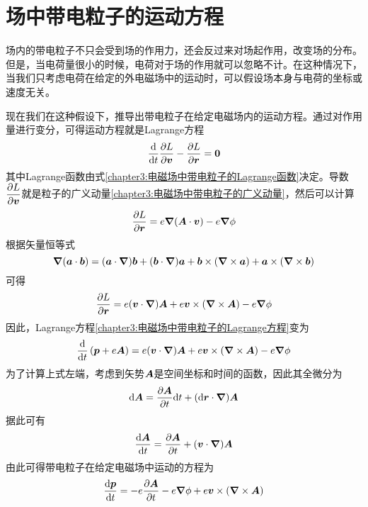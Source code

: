 \section{场中带电粒子的运动方程}

场内的带电粒子不只会受到场的作用力，还会反过来对场起作用，改变场的分布。但是，当电荷量很小的时候，电荷对于场的作用就可以忽略不计。在这种情况下，当我们只考虑电荷在给定的外电磁场中的运动时，可以假设场本身与电荷的坐标或速度无关。

现在我们在这种假设下，推导出带电粒子在给定电磁场内的运动方程。通过对作用量进行变分，可得运动方程就是Lagrange方程
\begin{equation}
	\frac{\mathrm{d}}{\mathrm{d} t} \frac{\partial L}{\partial \boldsymbol{v}} - \frac{\partial L}{\partial \boldsymbol{r}} = \boldsymbol{0}
	\label{chapter3:电磁场中带电粒子的Lagrange方程}
\end{equation}
其中Lagrange函数由式\eqref{chapter3:电磁场中带电粒子的Lagrange函数}决定。导数$\dfrac{\partial L}{\partial \boldsymbol{v}}$就是粒子的广义动量\eqref{chapter3:电磁场中带电粒子的广义动量}，然后可以计算
\begin{equation*}
	\frac{\partial L}{\partial \boldsymbol{r}} = e\boldsymbol{\nabla} (\boldsymbol{A}\cdot \boldsymbol{v}) - e\boldsymbol{\nabla} \phi
\end{equation*}
根据矢量恒等式
\begin{equation*}
	\boldsymbol{\nabla} (\boldsymbol{a}\cdot \boldsymbol{b}) = (\boldsymbol{a}\cdot \boldsymbol{\nabla})\boldsymbol{b} + (\boldsymbol{b}\cdot \boldsymbol{\nabla})\boldsymbol{a} + \boldsymbol{b}\times (\boldsymbol{\nabla} \times \boldsymbol{a}) + \boldsymbol{a}\times (\boldsymbol{\nabla} \times \boldsymbol{b})
\end{equation*}
可得
\begin{equation*}
	\frac{\partial L}{\partial \boldsymbol{r}} = e(\boldsymbol{v}\cdot \boldsymbol{\nabla})\boldsymbol{A} + e\boldsymbol{v}\times (\boldsymbol{\nabla} \times \boldsymbol{A}) - e\boldsymbol{\nabla} \phi
\end{equation*}
因此，Lagrange方程\eqref{chapter3:电磁场中带电粒子的Lagrange方程}变为
\begin{equation*}
	\frac{\mathrm{d}}{\mathrm{d} t}\left(\boldsymbol{p}+e\boldsymbol{A}\right) = e(\boldsymbol{v}\cdot \boldsymbol{\nabla})\boldsymbol{A} + e\boldsymbol{v}\times (\boldsymbol{\nabla} \times \boldsymbol{A}) - e\boldsymbol{\nabla} \phi
\end{equation*}
为了计算上式左端，考虑到矢势$\boldsymbol{A}$是空间坐标和时间的函数，因此其全微分为
\begin{equation*}
	\mathrm{d} \boldsymbol{A} = \frac{\partial \boldsymbol{A}}{\partial t}\mathrm{d} t + (\mathrm{d} \boldsymbol{r}\cdot \boldsymbol{\nabla}) \boldsymbol{A}
\end{equation*}
据此可有
\begin{equation*}
	\frac{\mathrm{d} \boldsymbol{A}}{\mathrm{d} t} = \frac{\partial \boldsymbol{A}}{\partial t} + (\boldsymbol{v}\cdot \boldsymbol{\nabla})\boldsymbol{A}
\end{equation*}
由此可得带电粒子在给定电磁场中运动的方程为
\begin{equation}
	\frac{\mathrm{d} \boldsymbol{p}}{\mathrm{d} t} = -e\frac{\partial \boldsymbol{A}}{\partial t} - e\boldsymbol{\nabla} \phi + e\boldsymbol{v}\times (\boldsymbol{\nabla} \times \boldsymbol{A})
	\label{chapter3:带电粒子在给定电磁场中的运动方程}
\end{equation}


